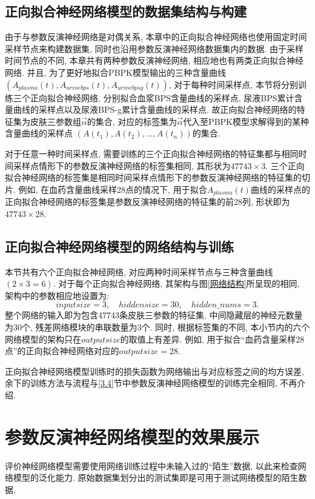 \documentclass[a4paper,punct=banjiao,twoside]{ctexrep}
\theoremstyle{plain}
\theoremstyle{definition}
\theoremstyle{remark}
\begin{document}
\subsection{正向拟合神经网络模型的数据集结构与构建}
\label{3.5.2}
由于与参数反演神经网络是对偶关系, 本章中的正向拟合神经网络也使用固定时间采样节点来构建数据集, 同时也沿用参数反演神经网络数据集内的数据. 由于采样时间节点的不同, 本章共有两种参数反演神经网络, 相应地也有两类正向拟合神经网络.
并且, 为了更好地拟合PBPK模型输出的三种含量曲线$(A_{plasma}(t), A_{urinebps}(t), A_{urinebpsg}(t))$, 对于每种时间采样点, 本节将分别训练三个正向拟合神经网络, 分别拟合血浆BPS含量曲线的采样点,
尿液BPS累计含量曲线的采样点以及尿液BPS-g累计含量曲线的采样点. 故正向拟合神经网络的特征集为皮肤三参数组$\vec{\alpha}$的集合, 对应的标签集为$\vec{\alpha}$代入至PBPK模型求解得到的某种含量曲线的采样点 $(A(t_1),A(t_2),\dots,A(t_n))$的集合.

对于任意一种时间采样点, 需要训练的三个正向拟合神经网络的特征集都与相同时间采样点情形下的参数反演神经网络的标签集相同, 其形状为$47743 \times 3$.
三个正向拟合神经网络的标签集是相同时间采样点情形下的参数反演神经网络的特征集的切片. 例如, 在血药含量曲线采样28点的情况下, 用于拟合$A_{plasma}(t)$曲线的采样点的正向拟合神经网络的标签集是参数反演神经网络的特征集的前28列, 形状即为$47743 \times 28$.

\subsection{正向拟合神经网络模型的网络结构与训练}

本节共有六个正向拟合神经网络, 对应两种时间采样节点与三种含量曲线$(2\times 3 = 6)$. 对于每个正向拟合神经网络, 其架构与图\ref{网络结构}所呈现的相同, 架构中的参数相应地设置为:
$$
inputsize = 3, \quad hiddensize = 30, \quad hidden\_nums = 3.
$$
\noindent 整个网络的输入即为包含47743条皮肤三参数的特征集, 中间隐藏层的神经元数量为30个, 残差网络模块的串联数量为3个. 同时, 根据标签集的不同, 本小节内的六个网络模型的架构只在$outputsize$的取值上有差异. 例如, 用于拟合``血药含量采样28点''的正向拟合神经网络对应的$outputsize=28$.

正向拟合神经网络模型训练时的损失函数为网络输出与对应标签之间的均方误差, 余下的训练方法与流程与\ref{3.4}节中参数反演神经网络模型的训练完全相同, 不再介绍.

\section{参数反演神经网络模型的效果展示}
\label{3.6}
评价神经网络模型需要使用网络训练过程中未输入过的``陌生''数据, 以此来检查网络模型的泛化能力. 原始数据集划分出的测试集即是可用于测试网络模型的陌生数据.
\end{document}

